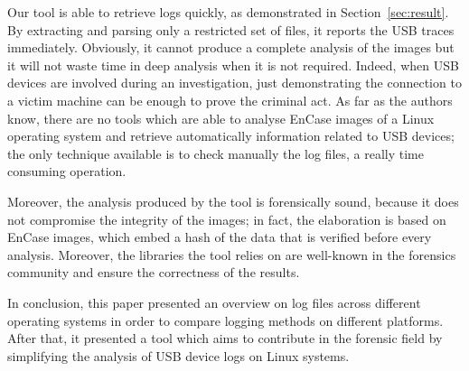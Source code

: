 \documentclass[a4paper,twocolumn]{article}
\begin{document}
Our tool is able to retrieve logs quickly, as demonstrated in
Section~\ref{sec:result}. By extracting and parsing only a restricted set of
files, it reports the USB traces immediately. Obviously, it cannot produce a
complete analysis of the images but it will not waste time in deep analysis when
it is not required. Indeed, when USB devices are involved during an
investigation, just demonstrating the connection to a victim machine can be
enough to prove the criminal act. As far as the authors know, there are no tools
which are able to analyse EnCase images of a Linux operating system and retrieve
automatically information related to USB devices; the only technique available
is to check manually the log files, a really time consuming operation.

Moreover, the analysis produced by the tool is forensically sound, because it
does not compromise the integrity of the images; in fact, the elaboration is
based on EnCase images, which embed a hash of the data that is verified before
every analysis. Moreover, the libraries the tool relies on are well-known in the
forensics community and ensure the correctness of the results.

In conclusion, this paper presented an overview on log files across different
operating systems in order to compare logging methods on different platforms.
After that, it presented a tool which aims to contribute in the forensic field
by simplifying the analysis of USB device logs on Linux systems.



\end{document}
